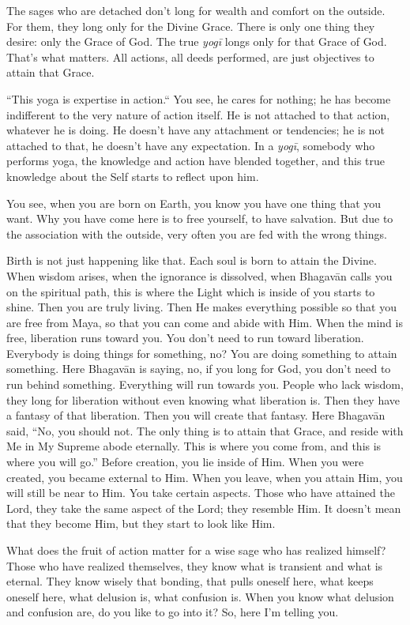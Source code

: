 The sages who are detached don’t long for wealth and comfort on the outside. For them, they long only for the Divine Grace. There is only one thing they desire: only the Grace of God. The true \textit{yogī} longs only for that Grace of God. That’s what matters. All actions, all deeds performed, are just objectives to attain that Grace.

“This yoga is expertise in action.“ You see, he cares for nothing; he has become indifferent to the very nature of action itself. He is not attached to that action, whatever he is doing. He doesn’t have any attachment or tendencies; he is not attached to that, he doesn’t have any expectation. In a \textit{yogī}, somebody who performs yoga, the knowledge and action have blended together, and this true knowledge about the Self starts to reflect upon him.

You see, when you are born on Earth, you know you have one thing that you want. Why you have come here is to free yourself, to have salvation. But due to the association with the outside, very often you are fed with the wrong things.

Birth is not just happening like that. Each soul is born to attain the Divine. When wisdom arises, when the ignorance is dissolved, when Bhagavān calls you on the spiritual path, this is where the Light which is inside of you starts to shine. Then you are truly living. Then He makes everything possible so that you are free from Maya, so that you can come and abide with Him. When the mind is free, liberation runs toward you. You don’t need to run toward liberation. Everybody is doing things for something, no? You are doing something to attain something. Here Bhagavān is saying, no, if you long for God, you don’t need to run behind something. Everything will run towards you. People who lack wisdom, they long for liberation without even knowing what liberation is. Then they have a fantasy of that liberation. Then you will create that fantasy. Here Bhagavān said, “No, you should not. The only thing is to attain that Grace, and reside with Me in My Supreme abode eternally. This is where you come from, and this is where you will go.” Before creation, you lie inside of Him. When you were created, you became external to Him. When you leave, when you attain Him, you will still be near to Him. You take certain aspects. Those who have attained the Lord, they take the same aspect of the Lord; they resemble Him. It doesn’t mean that they become Him, but they start to look like Him.

What does the fruit of action matter for a wise sage who has realized himself? Those who have realized themselves, they know what is transient and what is eternal. They know wisely that bonding, that pulls oneself here, what keeps oneself here, what delusion is, what confusion is. When you know what delusion and confusion are, do you like to go into it? So, here I’m telling you.

